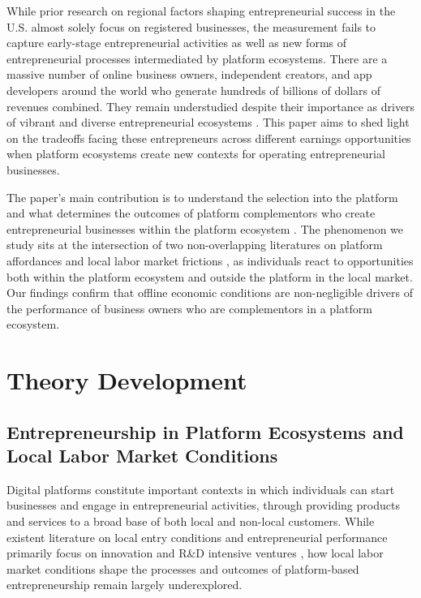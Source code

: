 \documentclass[letterpaper,12pt]{article}
\begin{document}
While prior research on regional factors shaping entrepreneurial success in the U.S. almost solely focus on registered businesses, the measurement fails to capture early-stage entrepreneurial activities as well as new forms of entrepreneurial processes intermediated by platform ecosystems. There are a massive number of online business owners, independent creators, and app developers around the world who generate hundreds of billions of dollars of revenues combined. They remain understudied despite their importance as drivers of vibrant and diverse entrepreneurial ecosystems \citep{shane_promise_2000,aldrich_unicorns_2018,cullen_outsourcing_2021}. This paper aims to shed light on the tradeoffs facing these entrepreneurs across different earnings opportunities when platform ecosystems create new contexts for operating entrepreneurial businesses.

The paper’s main contribution is to understand the selection into the platform and what determines the outcomes of platform complementors who create entrepreneurial businesses within the platform ecosystem \citep{cullen_outsourcing_2021}. The phenomenon we study sits at the intersection of two non-overlapping literatures on platform affordances \citep{gawer_bridging_2014,mcintyre_multisided_2021} and local labor market frictions \citep{campbell_rethinking_2012,starr_strategic_2018}, as individuals react to opportunities both within the platform ecosystem and outside the platform in the local market. Our findings confirm that offline economic conditions are non-negligible drivers of the performance of business owners who are complementors in a platform ecosystem.



\section{Theory Development}

\subsection{Entrepreneurship in Platform Ecosystems and Local Labor Market Conditions}

Digital platforms constitute important contexts in which individuals can start businesses and engage in entrepreneurial activities, through providing products and services to a broad base of both local and non-local customers. While existent literature on local entry conditions and entrepreneurial performance primarily focus on innovation and R\&D intensive ventures \citep{conti2021lowering,bias2022great,hacamo_forced_2022}, how local labor market conditions shape the processes and outcomes of platform-based entrepreneurship remain largely underexplored.
\end{document}
